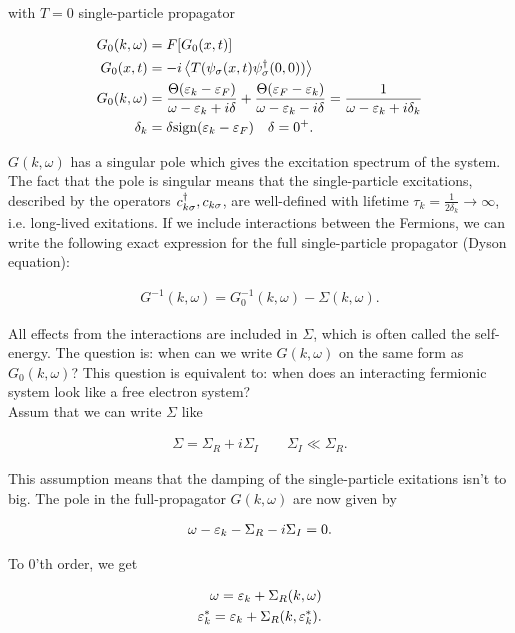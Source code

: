 with $T = 0$ single-particle propagator 

\begin{align*}
    G_0(k,\omega) &= F[G_0(x,t)] \\
    G_0(x,t) &= -i \expval{T(\psi_\sigma(x,t) \psi^{\dagger}_\sigma(0,0))} \\ 
    G_0(k,\omega) &= \frac{\Theta(\varepsilon_k - \varepsilon_F)}{\omega - \varepsilon_k + i\delta} + \frac{\Theta(\varepsilon_F - \varepsilon_k)}{\omega - \varepsilon_k - i\delta} = \frac{1}{\omega - \varepsilon_k +i\delta_k} \\ 
    \delta_k &= \delta \text{sign}(\varepsilon_k - \varepsilon_F)  \quad \delta = 0^+.
\end{align*}

$G(k,\omega)$ has a singular pole which gives the excitation spectrum of the system. The fact that the pole is singular means that the single-particle excitations, described by the operators $c^{\dagger}_{k\sigma}, c_{k\sigma}$, are well-defined with lifetime $\tau_k = \frac{1}{2\delta_k} \to \infty$, i.e. long-lived exitations. If we include interactions between the Fermions, we can write the following exact expression for the full single-particle propagator (Dyson equation):

\begin{align*}
    G^{-1}(k,\omega) = G_0^{-1}(k,\omega) - \Sigma(k,\omega). 
\end{align*}

All effects from the interactions are included in $\Sigma$, which is often called the self-energy. The question is: when can we write $G(k,\omega)$ on the same form as $G_0(k,\omega)$? This question is equivalent to: when does an interacting fermionic system look like a free electron system? \\ 

Assum that we can write $\Sigma$ like 

\begin{align*}
    \Sigma = \Sigma_R + i\Sigma_I \quad \quad \Sigma_I \ll \Sigma_R.
\end{align*}

This assumption means that the damping of the single-particle exitations isn't to big. The pole in the full-propagator $G(k,\omega)$ are now given by 

\begin{align*}
    \omega - \varepsilon_k - \Sigma_R - i\Sigma_I = 0.
\end{align*}

To 0'th order, we get 

\begin{align*}
    \omega = \varepsilon_k + \Sigma_R(k,\omega) \\
    \varepsilon_k^* = \varepsilon_k + \Sigma_R(k, \varepsilon_k^*). 
\end{align*}

